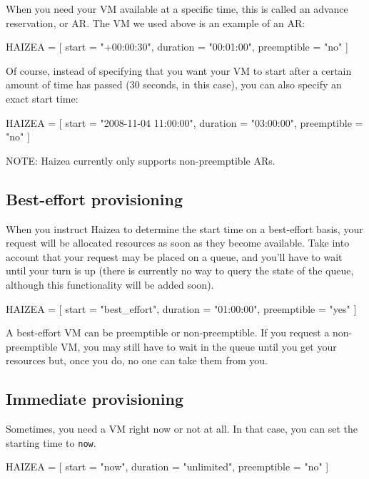 When you need your VM available at a specific time, this is called an advance reservation, or AR. The VM we used above is an example of an AR:

\begin{wideshellverbatim}
HAIZEA = [
  start        = "+00:00:30",
  duration     = "00:01:00",
  preemptible  = "no"
]
\end{wideshellverbatim}

Of course, instead of specifying that you want your VM to start after a certain amount of time has passed (30 seconds, in this case), you can also specify an exact start time:

\begin{wideshellverbatim}
HAIZEA = [
  start        = "2008-11-04 11:00:00",
  duration     = "03:00:00",
  preemptible  = "no"
]
\end{wideshellverbatim}

NOTE: Haizea currently only supports non-preemptible ARs.

\subsection{Best-effort provisioning}

When you instruct Haizea to determine the start time on a best-effort basis, your request will be allocated resources as soon as they become available. Take into account that your request may be placed on a queue, and you'll have to wait until your turn is up (there is currently no way to query the state of the queue, although this functionality will be added soon).

\begin{wideshellverbatim}
HAIZEA = [
  start        = "best_effort",
  duration     = "01:00:00",
  preemptible  = "yes"
]
\end{wideshellverbatim}

A best-effort VM can be preemptible or non-preemptible. If you request a non-preemptible VM, you may still have to wait in the queue until you get your resources but, once you do, no one can take them from you.

\subsection{Immediate provisioning}

Sometimes, you need a VM right now or not at all. In that case, you can set the starting time to \texttt{now}.

\begin{wideshellverbatim}
HAIZEA = [
  start        = "now",
  duration     = "unlimited",
  preemptible  = "no"
]
\end{wideshellverbatim}

